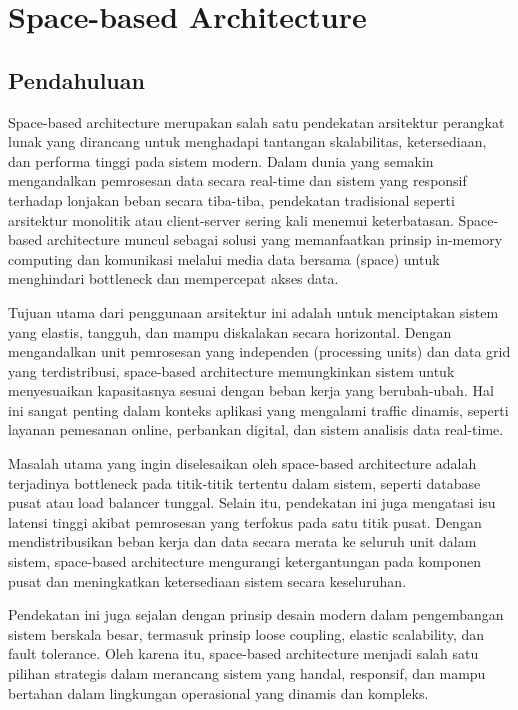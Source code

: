 \chapter{Space-based Architecture}

\section{Pendahuluan}

Space-based architecture merupakan salah satu pendekatan arsitektur perangkat lunak yang dirancang untuk menghadapi tantangan skalabilitas, ketersediaan, dan performa tinggi pada sistem modern. Dalam dunia yang semakin mengandalkan pemrosesan data secara real-time dan sistem yang responsif terhadap lonjakan beban secara tiba-tiba, pendekatan tradisional seperti arsitektur monolitik atau client-server sering kali menemui keterbatasan. Space-based architecture muncul sebagai solusi yang memanfaatkan prinsip in-memory computing dan komunikasi melalui media data bersama (space) untuk menghindari bottleneck dan mempercepat akses data.

Tujuan utama dari penggunaan arsitektur ini adalah untuk menciptakan sistem yang elastis, tangguh, dan mampu diskalakan secara horizontal. Dengan mengandalkan unit pemrosesan yang independen (processing units) dan data grid yang terdistribusi, space-based architecture memungkinkan sistem untuk menyesuaikan kapasitasnya sesuai dengan beban kerja yang berubah-ubah. Hal ini sangat penting dalam konteks aplikasi yang mengalami traffic dinamis, seperti layanan pemesanan online, perbankan digital, dan sistem analisis data real-time.

Masalah utama yang ingin diselesaikan oleh space-based architecture adalah terjadinya bottleneck pada titik-titik tertentu dalam sistem, seperti database pusat atau load balancer tunggal. Selain itu, pendekatan ini juga mengatasi isu latensi tinggi akibat pemrosesan yang terfokus pada satu titik pusat. Dengan mendistribusikan beban kerja dan data secara merata ke seluruh unit dalam sistem, space-based architecture mengurangi ketergantungan pada komponen pusat dan meningkatkan ketersediaan sistem secara keseluruhan.

Pendekatan ini juga sejalan dengan prinsip desain modern dalam pengembangan sistem berskala besar, termasuk prinsip loose coupling, elastic scalability, dan fault tolerance. Oleh karena itu, space-based architecture menjadi salah satu pilihan strategis dalam merancang sistem yang handal, responsif, dan mampu bertahan dalam lingkungan operasional yang dinamis dan kompleks.

